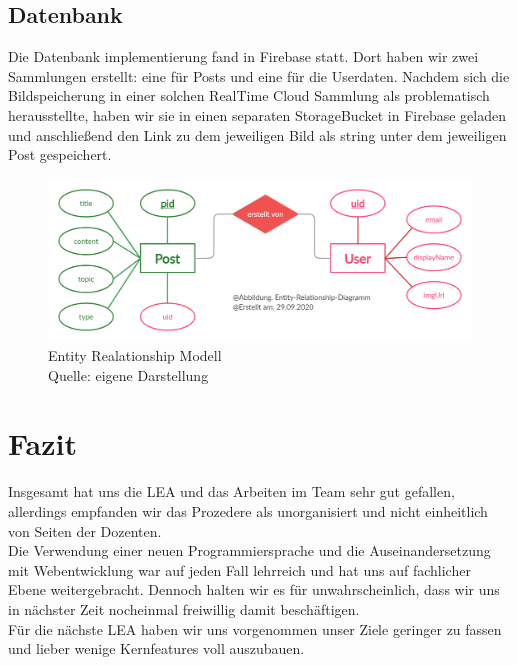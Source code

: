 \documentclass[12pt,titlepage]{article}
\begin{document}
\FloatBarrier

\subsection{Datenbank}

Die Datenbank implementierung fand in Firebase statt. Dort haben wir zwei Sammlungen erstellt: eine für Posts und eine für die Userdaten. 
Nachdem sich die Bildspeicherung in einer solchen RealTime Cloud Sammlung als problematisch herausstellte, haben wir sie in einen separaten StorageBucket in Firebase geladen und anschließend den Link zu dem jeweiligen Bild als string unter dem jeweiligen Post gespeichert. 

\begin{figure}[!htb]
\centering
\includegraphics[width=400pt]{abbildungen/Abbildung_ERM.png}
\caption[ERM]{Entity Realationship Modell \\Quelle: eigene Darstellung}
\end{figure}

\FloatBarrier

\section{Fazit}
Insgesamt hat uns die LEA und das Arbeiten im Team sehr gut gefallen, allerdings empfanden wir das Prozedere als unorganisiert und nicht einheitlich von Seiten der Dozenten.\\

Die Verwendung einer neuen Programmiersprache und die Auseinandersetzung mit Webentwicklung war auf jeden Fall lehrreich und hat uns auf fachlicher Ebene weitergebracht. Dennoch halten wir es für unwahrscheinlich, dass wir uns in nächster Zeit nocheinmal freiwillig damit beschäftigen. \\

Für die nächste LEA haben wir uns vorgenommen unser Ziele geringer zu fassen und lieber wenige Kernfeatures voll auszubauen.
\end{document}
